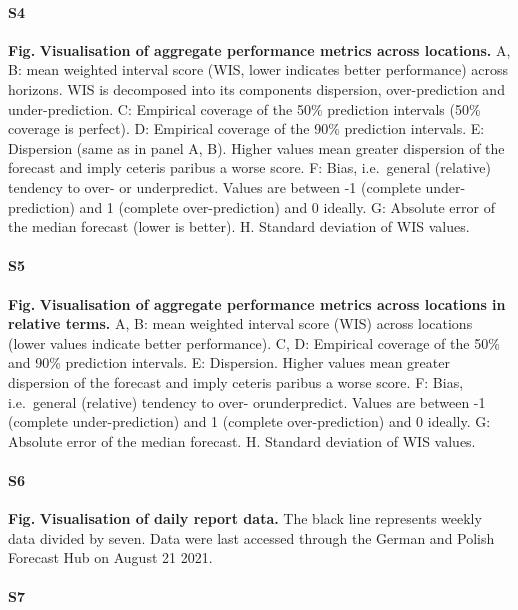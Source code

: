 \documentclass[10pt,letterpaper]{article}
\begin{document}
\paragraph{S4}

\textbf{Fig.} \label{fig:performance-locations}
\textbf{Visualisation of aggregate performance metrics across locations.}
A, B: mean weighted interval score (WIS, lower indicates better
performance) across horizons. WIS is decomposed into its components
dispersion, over-prediction and under-prediction. C: Empirical coverage
of the 50\% prediction intervals (50\% coverage is perfect). D:
Empirical coverage of the 90\% prediction intervals. E: Dispersion (same
as in panel A, B). Higher values mean greater dispersion of the forecast
and imply ceteris paribus a worse score. F: Bias, i.e.~general
(relative) tendency to over- or underpredict. Values are between -1
(complete under-prediction) and 1 (complete over-prediction) and 0
ideally. G: Absolute error of the median forecast (lower is better). H.
Standard deviation of WIS values.

\paragraph{S5}

\textbf{Fig.} \label{fig:performance-locations-rel}
\textbf{Visualisation of aggregate performance metrics across locations in relative terms.}
A, B: mean weighted interval score (WIS) across locations (lower values
indicate better performance). C, D: Empirical coverage of the 50\% and
90\% prediction intervals. E: Dispersion. Higher values mean greater
dispersion of the forecast and imply ceteris paribus a worse score. F:
Bias, i.e.~general (relative) tendency to over- orunderpredict. Values
are between -1 (complete under-prediction) and 1 (complete
over-prediction) and 0 ideally. G: Absolute error of the median
forecast. H. Standard deviation of WIS values.

\paragraph{S6}

\textbf{Fig.} \label{fig:daily-truth}
\textbf{Visualisation of daily report data.} The black line represents
weekly data divided by seven. Data were last accessed through the German
and Polish Forecast Hub on August 21 2021.

\paragraph{S7}
\end{document}
